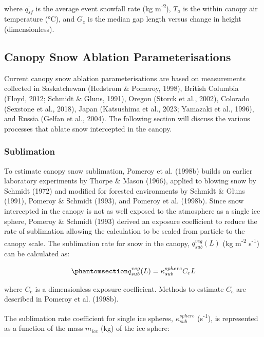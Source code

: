 \documentclass[
  letterpaper,
]{tex/uofsthesis-cs}
\begin{document}
where \(\overline{q_{sf}}\) is the average event snowfall rate (kg
m\textsuperscript{-2}), \(T_{a}\) is the within canopy air temperature
(°C), and \(G_z\) is the median gap length versus change in height
(dimensionless).

\subsection{Canopy Snow Ablation Parameterisations}\label{sec-ablation}

Current canopy snow ablation parameterisations are based on measurements
collected in Saskatchewan (Hedstrom \& Pomeroy, 1998), British Columbia
(Floyd, 2012; Schmidt \& Gluns, 1991), Oregon (Storck et al., 2002),
Colorado (Sexstone et al., 2018), Japan (Katsushima et al., 2023;
Yamazaki et al., 1996), and Russia (Gelfan et al., 2004). The following
section will discuss the various processes that ablate snow intercepted
in the canopy.

\subsubsection{Sublimation}\label{sublimation}

To estimate canopy snow sublimation, Pomeroy et al. (1998b) builds on
earlier laboratory experiments by Thorpe \& Mason (1966), applied to
blowing snow by Schmidt (1972) and modified for forested environments by
Schmidt \& Gluns (1991), Pomeroy \& Schmidt (1993), and Pomeroy et al.
(1998b). Since snow intercepted in the canopy is not as well exposed to
the atmosphere as a single ice sphere, Pomeroy \& Schmidt (1993) derived
an exposure coefficient to reduce the rate of sublimation allowing the
calculation to be scaled from particle to the canopy scale. The
sublimation rate for snow in the canopy, \(q_{sub}^{veg}(L)\) (kg
m\textsuperscript{-2} s\textsuperscript{-1}) can be calculated as:

\begin{equation}\phantomsection\label{eq-pom98-v_i}{
q_{sub}^{veg}(L) = \kappa_{sub}^{sphere} C_e L
}\end{equation}

where \(C_e\) is a dimensionless exposure coefficient. Methods to
estimate \(C_e\) are described in Pomeroy et al. (1998b).

The sublimation rate coefficient for single ice spheres,
\(\kappa_{sub}^{sphere}\) (s\textsuperscript{-1}), is represented as a
function of the mass \(m_{ice}\) (kg) of the ice sphere:
\end{document}
